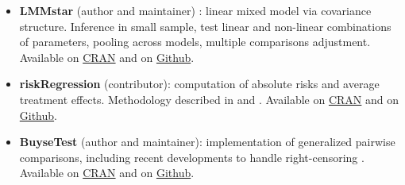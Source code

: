 \documentclass[12pt]{article}
\begin{document}
\begin{itemize}
\item \textbf{LMMstar} (author and maintainer) : linear mixed model via
covariance structure. Inference in small sample, test linear and
non-linear combinations of parameters, pooling across models,
multiple comparisons adjustment. Available on \href{https://cran.r-project.org/web/packages/LMMstar/index.html}{CRAN} and on \href{https://github.com/bozenne/LMMstar}{Github}.

\item \textbf{riskRegression} (contributor): computation of absolute risks and
average treatment effects. Methodology described in
\citep{ozenne2017riskregression} and
\citep{ozenne2020estimation}. Available on \href{https://cran.r-project.org/web/packages/riskRegression/index.html}{CRAN} and on \href{https://github.com/tagteam/riskRegression}{Github}.

\item \textbf{BuyseTest} (author and maintainer): implementation of generalized
pairwise comparisons, including recent developments to handle
right-censoring \citep{ozenne2021asymptotic}. Available on \href{https://cran.r-project.org/web/packages/BuyseTest/index.html}{CRAN} and on
\href{https://github.com/bozenne/BuyseTest}{Github}.
\end{itemize}


\end{document}
